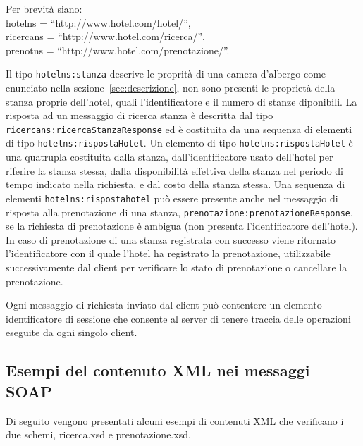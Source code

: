 \documentclass[a4paper]{article}
\begin{document}
Per brevit\`a siano:\\
hotelns = ``http://www.hotel.com/hotel/'',\\
ricercans = ``http://www.hotel.com/ricerca/'', \\
prenotns = ``http://www.hotel.com/prenotazione/''.

Il tipo \verb'hotelns:stanza' descrive le proprit\`a di una camera
d'albergo come enunciato nella sezione~\ref{sec:descrizione}, non sono
presenti le propriet\`a della stanza proprie dell'hotel, quali
l'identificatore e il numero di stanze diponibili. La risposta ad un
messaggio di ricerca stanza \`e descritta dal tipo
\verb'ricercans:ricercaStanzaResponse' ed \`e costituita da una
sequenza di elementi di tipo \verb'hotelns:rispostaHotel'. Un elemento
di tipo \verb'hotelns:rispostaHotel' \`e una quatrupla costituita
dalla stanza, dall'identificatore usato dell'hotel per riferire la
stanza stessa, dalla disponibilit\`a effettiva della stanza nel
periodo di tempo indicato nella richiesta, e dal costo della stanza
stessa. Una sequenza di elementi \verb'hotelns:rispostahotel' pu\`o
essere presente anche nel messaggio di risposta alla prenotazione di
una stanza, \verb'prenotazione:prenotazioneRespo'\-\verb'nse', se la richiesta
di prenotazione \`e ambigua (non presenta l'identificatore
dell'hotel). In caso di prenotazione di una stanza registrata con
successo viene ritornato l'identificatore con il quale l'hotel ha
registrato la prenotazione, utilizzabile successivamente dal client
per verificare lo stato di prenotazione o cancellare la prenotazione. 

Ogni messaggio di richiesta inviato dal client pu\`o contentere un
elemento identificatore di sessione che consente al server di tenere
traccia delle operazioni eseguite da ogni singolo client.


\subsection{Esempi del contenuto XML nei messaggi SOAP}
Di seguito vengono presentati alcuni esempi di contenuti XML che
verificano i due schemi, ricerca.xsd e prenotazione.xsd.

\lstset{basicstyle=\small, tabsize=2, language=XML, breaklines=true,
  captionpos=b, frame=single}  



\end{document}
